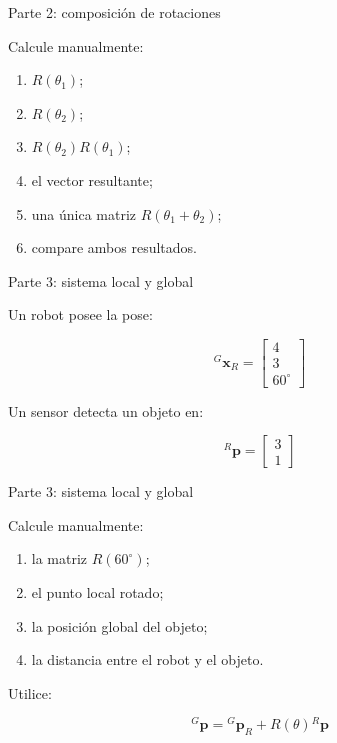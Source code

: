 \documentclass[aspectratio=169]{beamer}
\begin{document}
\begin{frame}{Parte 2: composición de rotaciones}

    Calcule manualmente:

    \begin{enumerate}
        \item $R(\theta_1)$;
        \item $R(\theta_2)$;
        \item $R(\theta_2)R(\theta_1)$;
        \item el vector resultante;
        \item una única matriz $R(\theta_1+\theta_2)$;
        \item compare ambos resultados.
    \end{enumerate}

\end{frame}

\begin{frame}{Parte 3: sistema local y global}

    Un robot posee la pose:

    \[
    {}^{G}\mathbf{x}_R
    =
    \begin{bmatrix}
        4\\
        3\\
        60^\circ
    \end{bmatrix}
    \]

    Un sensor detecta un objeto en:

    \[
    {}^{R}\mathbf{p}
    =
    \begin{bmatrix}
        3\\
        1
    \end{bmatrix}
    \]

\end{frame}

\begin{frame}{Parte 3: sistema local y global}

    Calcule manualmente:

    \begin{enumerate}
        \item la matriz $R(60^\circ)$;
        \item el punto local rotado;
        \item la posición global del objeto;
        \item la distancia entre el robot y el objeto.
    \end{enumerate}

    Utilice:

    \[
    {}^{G}\mathbf{p}
    =
    {}^{G}\mathbf{p}_R+
    R(\theta){}^{R}\mathbf{p}
    \]

\end{frame}
\end{document}
